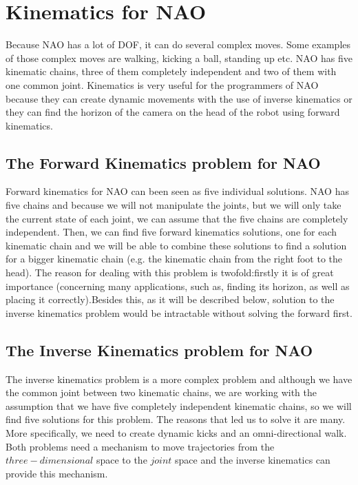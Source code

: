 \newpage
\section{Kinematics for NAO}
Because NAO has a lot of DOF, it can do several complex moves. Some examples of those complex moves are walking, kicking a ball, standing up etc. NAO has five kinematic chains, three of them completely independent and two of them with one common joint. Kinematics is very useful for the programmers of NAO because they can create dynamic movements with the use of inverse kinematics or they can find the horizon of the camera on the head of the robot using forward kinematics.
\subsection{The Forward Kinematics problem for NAO}
Forward kinematics for NAO can been seen as five individual solutions. NAO has five chains and because we will not manipulate the joints, but we will only take the current state of each joint, we can assume that the five chains are completely independent. Then, we can find five forward kinematics solutions, one for each kinematic chain and we will be able to combine these solutions to find a solution for a bigger kinematic chain (e.g. the kinematic chain from the right foot to the head). The reason for dealing with this problem is twofold:firstly it is of great importance (concerning many applications, such as, finding its horizon, as well as placing it correctly).Besides this, as it will be described below, solution to the inverse kinematics problem would be intractable without solving the forward first.

\subsection{The Inverse Kinematics problem for NAO}
The inverse kinematics problem is a more complex problem and although we have the common joint between two kinematic chains, we are working with the assumption that we have five completely independent kinematic chains, so we will find five solutions for this problem. The reasons that led us to solve it are many. More specifically, we need to create dynamic kicks and an omni-directional walk. Both problems need a mechanism to move trajectories from the \(three-dimensional\) space to the \(joint\) space and the inverse kinematics can provide this mechanism.\\

